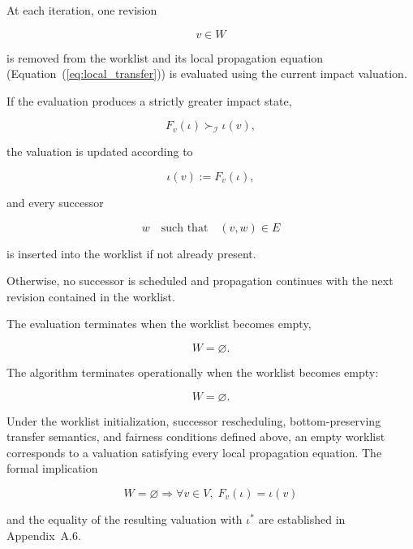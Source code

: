 \documentclass[10pt]{article}
\begin{document}
At each iteration, one revision

\[
v\in W
\]

is removed from the worklist and its local propagation equation
(Equation~(\ref{eq:local_transfer})) is evaluated using the current impact
valuation.

If the evaluation produces a strictly greater impact state,

\begin{equation}
	\label{eq:worklist_update}
	F_v(\iota)
	\succ_{\mathcal I}
	\iota(v),
\end{equation}

the valuation is updated according to

\begin{equation}
	\label{eq:worklist_assignment}
	\iota(v)
	:=
	F_v(\iota),
\end{equation}

and every successor

\[
w
\quad
\text{such that}
\quad
(v,w)\in E
\]

is inserted into the worklist if not already present.

Otherwise, no successor is scheduled and propagation continues with the next
revision contained in the worklist.

The evaluation terminates when the worklist becomes empty,

\begin{equation}
	\label{eq:worklist_stop}
	W
	=
	\varnothing.
\end{equation}

The algorithm terminates operationally when the worklist becomes empty:

\begin{equation}
	W
	=
	\varnothing.
	\label{eq:worklist_stop}
\end{equation}

Under the worklist initialization, successor rescheduling, bottom-preserving
transfer semantics, and fairness conditions defined above, an empty worklist
corresponds to a valuation satisfying every local propagation equation. The
formal implication

\begin{equation}
	W
	=
	\varnothing
	\Longrightarrow
	\forall v\in V,\;
	F_v(\iota)
	=
	\iota(v)
	\label{eq:worklist_local_equilibrium}
\end{equation}

and the equality of the resulting valuation with $\iota^{*}$ are established
in Appendix~A.6.
\end{document}

